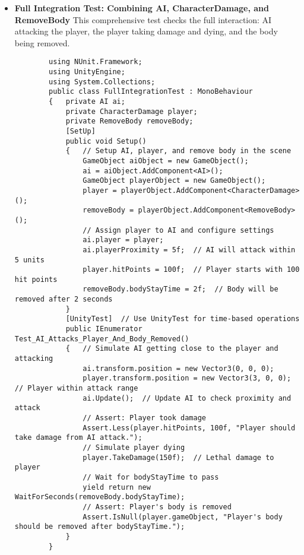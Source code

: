 \begin{itemize}
	\item  \textbf{Full Integration Test: Combining AI, CharacterDamage, and RemoveBody}
	This comprehensive test checks the full interaction: AI attacking the player, the player taking damage and dying, and the body being removed.
	\begin{lstlisting}
		using NUnit.Framework;
		using UnityEngine;
		using System.Collections;
		public class FullIntegrationTest : MonoBehaviour
		{   private AI ai;
			private CharacterDamage player;
			private RemoveBody removeBody;
			[SetUp]
			public void Setup()
			{   // Setup AI, player, and remove body in the scene
				GameObject aiObject = new GameObject();
				ai = aiObject.AddComponent<AI>();
				GameObject playerObject = new GameObject();
				player = playerObject.AddComponent<CharacterDamage>();
				removeBody = playerObject.AddComponent<RemoveBody>();
				// Assign player to AI and configure settings
				ai.player = player;
				ai.playerProximity = 5f;  // AI will attack within 5 units
				player.hitPoints = 100f;  // Player starts with 100 hit points
				removeBody.bodyStayTime = 2f;  // Body will be removed after 2 seconds
			}
			[UnityTest]  // Use UnityTest for time-based operations
			public IEnumerator Test_AI_Attacks_Player_And_Body_Removed()
			{   // Simulate AI getting close to the player and attacking
				ai.transform.position = new Vector3(0, 0, 0);
				player.transform.position = new Vector3(3, 0, 0);  // Player within attack range
				ai.Update();  // Update AI to check proximity and attack
				// Assert: Player took damage
				Assert.Less(player.hitPoints, 100f, "Player should take damage from AI attack.");
				// Simulate player dying
				player.TakeDamage(150f);  // Lethal damage to player
				// Wait for bodyStayTime to pass
				yield return new WaitForSeconds(removeBody.bodyStayTime);
				// Assert: Player's body is removed
				Assert.IsNull(player.gameObject, "Player's body should be removed after bodyStayTime.");
			}
		}
	\end{lstlisting}
	

\end{itemize}
